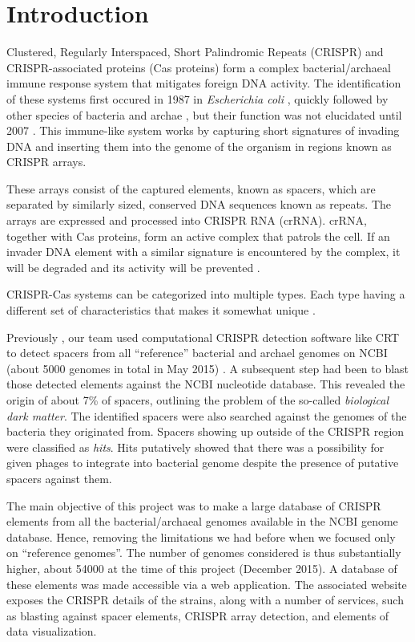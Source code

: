 \documentclass[11pt, a4paper,titlepage]{article}
\begin{document}


\section{Introduction}

Clustered, Regularly Interspaced, Short Palindromic Repeats (CRISPR)
and CRISPR-associated proteins (Cas proteins) form a complex
bacterial/archaeal immune response system that mitigates foreign DNA
activity. The identification of these systems first occured in 1987 in
\emph{Escherichia coli} \cite{nakata1989unusual}, quickly followed by
other species of bacteria and archae \cite{mojica1995long}, but their
function was not elucidated until 2007 \cite{Barrangou23032007}. This
immune-like system works by capturing short signatures of invading DNA
and inserting them into the genome of the organism in regions known as
CRISPR arrays.

These arrays consist of the captured elements, known as spacers, which
are separated by similarly sized, conserved DNA sequences known as
repeats.  The arrays are expressed and processed into CRISPR RNA
(crRNA). crRNA, together with Cas proteins, form an active complex
that patrols the cell. If an invader DNA element with a similar
signature is encountered by the complex, it will be degraded and its
activity will be prevented \cite{Horvath08012010}.

CRISPR-Cas systems can be categorized into multiple types. Each type
having a different set of characteristics that makes it somewhat
unique \cite{makarova2011evolution}.

Previously \cite{Omicians2015}, our team used computational CRISPR
detection software like CRT \cite{bland2007crispr} to detect spacers
from all ``reference'' bacterial and archael genomes on NCBI (about
5000 genomes in total in May 2015) . A subsequent step had been to
blast those detected elements against the NCBI nucleotide
database. This revealed the origin of about 7\% of spacers, outlining
the problem of the so-called \emph{biological dark matter}. The
identified spacers were also searched against the genomes of the
bacteria they originated from. Spacers showing up outside of the
CRISPR region were classified as \emph{hits}. Hits putatively showed
that there was a possibility for given phages to integrate into
bacterial genome despite the presence of putative spacers against
them.

The main objective of this project was to make a large database of
CRISPR elements from all the bacterial/archaeal genomes available in
the NCBI genome database. Hence, removing the limitations we had
before when we focused only on ``reference genomes''. The number of
genomes considered is thus substantially higher, about 54000 at the
time of this project (December 2015). A database of these elements was
made accessible via a web application. The associated website exposes
the CRISPR details of the strains, along with a number of services,
such as blasting against spacer elements, CRISPR array detection, and
elements of data visualization.
\end{document}
